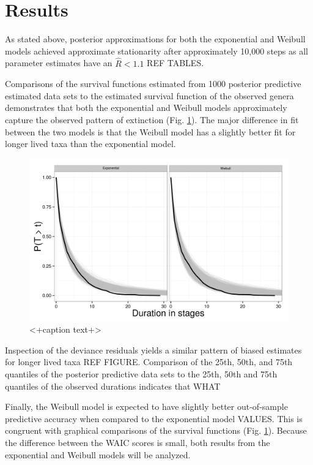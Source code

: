 \documentclass[12pt,letterpaper]{article}
\begin{document}
\section{Results}


As stated above, posterior approximations for both the exponential and Weibull models achieved approximate stationarity after approximately 10,000 steps as all parameter estimates have an \(\hat{R} < 1.1\) \uppercase{ref tables}. 

Comparisons of the survival functions estimated from 1000 posterior predictive estimated data sets to the estimated survival function of the observed genera demonstrates that both the exponential and Weibull models approximately capture the observed pattern of extinction (Fig. \ref{fig:surv}). The major difference in fit between the two models is that the Weibull model has a slightly better fit for longer lived taxa than the exponential model.

\begin{figure}[ht]
  \centering
  \includegraphics[height = 0.5\textheight,width=\textwidth,keepaspectratio=true]{figure/survival_curves}
  \caption{<+caption text+>}
  \label{fig:surv}
\end{figure}

Inspection of the deviance residuals yields a similar pattern of biased estimates for longer lived taxa \uppercase{ref figure}. Comparison of the 25th, 50th, and 75th quantiles of the posterior predictive data sets to the 25th, 50th and 75th quantiles of the observed durations indicates that \uppercase{what}

Finally, the Weibull model is expected to have slightly better out-of-sample predictive accuracy when compared to the exponential model \uppercase{values}. This is congruent with graphical comparisons of the survival functions (Fig. \ref{fig:surv}). Because the difference between the WAIC scores is small, both results from the exponential and Weibull models will be analyzed.
\end{document}
